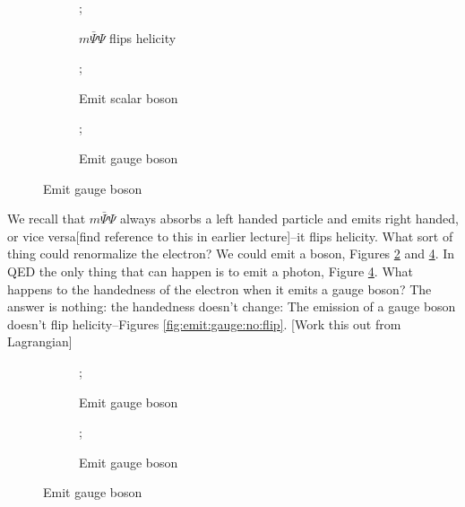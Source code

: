 \documentclass[]{article}
\begin{document}
\begin{figure}[H]
	\begin{center}
		\caption{Feynman diagram for $m \bar{\Psi} \Psi$}
		\begin{subfigure}[t]{0.3\textwidth}
			\caption{$m \bar{\Psi} \Psi$ flips helicity}\label{fig:Fermion:feynman}
			;
		\end{subfigure}
		\begin{subfigure}[t]{0.3\textwidth}
				\caption{Emit scalar boson}\label{fig:emit:scalar}
				;
		\end{subfigure}
		\begin{subfigure}[t]{0.3\textwidth}
			\caption{Emit gauge boson}\label{fig:emit:gauge}
			;
		\end{subfigure}
	\end{center}
\end{figure}

We recall that $m \bar{\Psi} \Psi$ always absorbs a left handed particle and emits right handed, or vice versa[find reference to this in earlier lecture]--it flips helicity. What sort of thing could renormalize the electron? We could emit a boson, Figures \ref{fig:emit:scalar} and \ref{fig:emit:gauge}. In QED the only thing that can happen is to emit a photon, Figure \ref{fig:emit:gauge}. What happens to the handedness of the electron when it emits a gauge boson? The answer is nothing: the handedness doesn't change: The emission of a gauge boson doesn't flip helicity--Figures \ref{fig:emit:gauge:no:flip}.
[Work this out from Lagrangian]
\begin{figure}[H]
	\begin{center}
		\caption{Emission of a gauge boson doesn't flip helicity}\label{fig:emit:gauge:no:flip}
		\begin{subfigure}[t]{0.3\textwidth}
			\caption{Emit gauge boson}\label{fig:emit:gauge:LL}
			;
		\end{subfigure}
		\begin{subfigure}[t]{0.3\textwidth}
			\caption{Emit gauge boson}\label{fig:emit:gauge:RR}
			;
		\end{subfigure}
	\end{center}
\end{figure}
\end{document}

